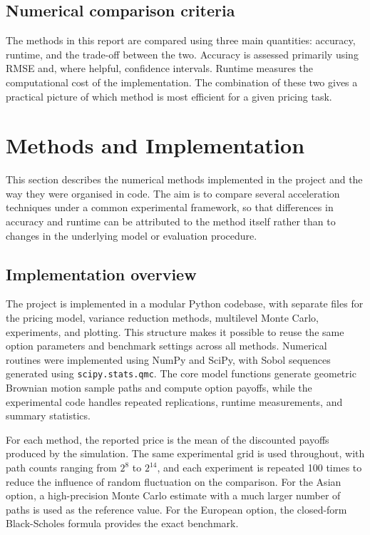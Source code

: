 \documentclass[11pt]{article}
\begin{document}
\subsection{Numerical comparison criteria}

The methods in this report are compared using three main quantities: accuracy, runtime, and the trade-off between the two. Accuracy is assessed primarily using RMSE and, where helpful, confidence intervals. Runtime measures the computational cost of the implementation. The combination of these two gives a practical picture of which method is most efficient for a given pricing task.


\section{Methods and Implementation}

This section describes the numerical methods implemented in the project and the way they were organised in code. The aim is to compare several acceleration techniques under a common experimental framework, so that differences in accuracy and runtime can be attributed to the method itself rather than to changes in the underlying model or evaluation procedure.

\subsection{Implementation overview}

The project is implemented in a modular Python codebase, with separate files for the pricing model, variance reduction methods, multilevel Monte Carlo, experiments, and plotting. This structure makes it possible to reuse the same option parameters and benchmark settings across all methods. Numerical routines were implemented using NumPy and SciPy, with Sobol sequences generated using \texttt{scipy.stats.qmc}. The core model functions generate geometric Brownian motion sample paths and compute option payoffs, while the experimental code handles repeated replications, runtime measurements, and summary statistics.

For each method, the reported price is the mean of the discounted payoffs produced by the simulation. The same experimental grid is used throughout, with path counts ranging from $2^8$ to $2^{14}$, and each experiment is repeated 100 times to reduce the influence of random fluctuation on the comparison. For the Asian option, a high-precision Monte Carlo estimate with a much larger number of paths is used as the reference value. For the European option, the closed-form Black-Scholes formula provides the exact benchmark.
\end{document}
